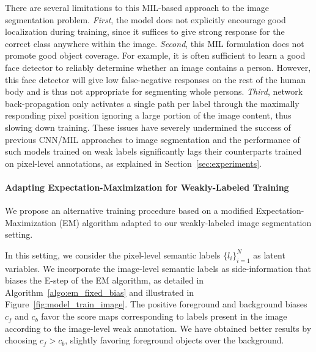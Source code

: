 There are several limitations to this MIL-based approach to the image
segmentation problem. \emph{First}, the model does not explicitly
encourage good localization during training, since it suffices to give
strong response for the correct class anywhere within the
image. \emph{Second}, this MIL formulation does not promote good
object coverage. For example, it is often sufficient to learn a good
face detector to reliably determine whether an image contains a
person. However, this face detector will give low false-negative
responses on the rest of the human body and is thus not appropriate
for segmenting whole persons. \emph{Third}, network back-propagation
only activates a single path per label through the maximally
responding pixel position ignoring a large portion of the image
content, thus slowing down training. These issues have severely
undermined the success of previous CNN/MIL approaches to image
segmentation and the performance of such models trained on weak labels
significantly lags their counterparts trained on pixel-level
annotations, as explained in Section~\ref{sec:experiments}.

\paragraph{Adapting Expectation-Maximization for Weakly-Labeled Training}

We propose an alternative training procedure based on a modified
Expectation-Maximization (EM) algorithm adapted to our weakly-labeled
image segmentation setting.

In this setting, we consider the pixel-level semantic labels
$\{l_i\}_{i=1}^N$ as latent variables. We incorporate the image-level
semantic labels as side-information that biases the E-step of the EM
algorithm, as detailed in Algorithm~\ref{algo:em_fixed_bias} and
illustrated in Figure~\ref{fig:model_train_image}. The positive
foreground and background biases $c_f$ and $c_b$ favor the score maps
corresponding to labels present in the image according to the
image-level weak annotation. We have obtained better results by
choosing $c_f > c_b$, slightly favoring foreground objects over the
background.

